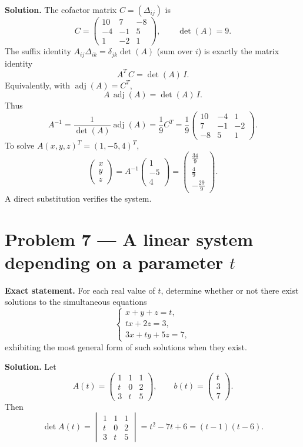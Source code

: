 \documentclass[12pt,a4paper]{article}
\theoremstyle{plain}
\theoremstyle{definition}      %
\begin{document}
\textbf{Solution.}
The cofactor matrix \(C=(\Delta_{ij})\) is
\[
C=\begin{pmatrix}
	10&7&-8\\
	-4&-1&5\\
	1&-2&1
\end{pmatrix},
\qquad \det(A)=9.
\]
The suffix identity \(A_{ij}\Delta_{ik}=\delta_{jk}\det(A)\) (sum over \(i\)) is exactly the matrix identity
\[
A^T\,C=\det(A)\,I.
\]
Equivalently, with \(\operatorname{adj}(A)=C^T\),
\[
A\,\operatorname{adj}(A)=\det(A)\,I.
\]
Thus
\[
A^{-1}=\frac{1}{\det(A)}\operatorname{adj}(A)=\frac{1}{9}C^T
=\frac{1}{9}\begin{pmatrix}
	10&-4&1\\
	7&-1&-2\\
	-8&5&1
\end{pmatrix}.
\]
To solve \(A(x,y,z)^T=(1,-5,4)^T\),
\[
\begin{pmatrix}x\\y\\z\end{pmatrix}
=A^{-1}\begin{pmatrix}1\\-5\\4\end{pmatrix}
=\begin{pmatrix}\frac{34}{9}\\[2pt]\frac{4}{9}\\[2pt]-\frac{29}{9}\end{pmatrix}.
\]
A direct substitution verifies the system.


\section*{Problem 7 — A linear system depending on a parameter \(t\)}

\textbf{Exact statement.}
For each real value of \(t\), determine whether or not there exist solutions to the simultaneous equations
\[
\begin{cases}
	x+y+z=t,\\
	tx+2z=3,\\
	3x+ty+5z=7,
\end{cases}
\]
exhibiting the most general form of such solutions when they exist.

\textbf{Solution.}
Let
\[
A(t)=\begin{pmatrix}
	1&1&1\\
	t&0&2\\
	3&t&5
\end{pmatrix},\qquad
b(t)=\begin{pmatrix}t\\3\\7\end{pmatrix}.
\]
Then
\[
\det A(t)=
\begin{vmatrix}
	1&1&1\\
	t&0&2\\
	3&t&5
\end{vmatrix}
=t^2-7t+6=(t-1)(t-6).
\]
\end{document}
